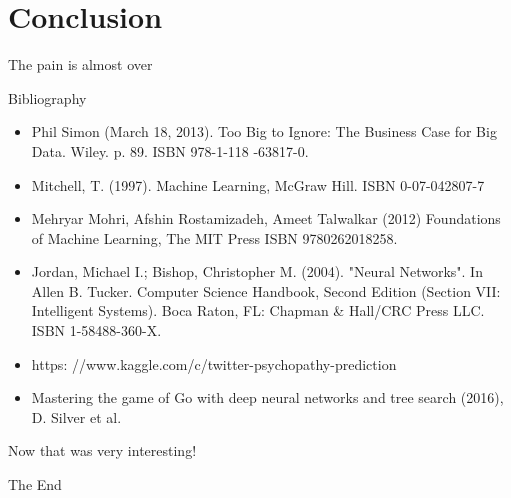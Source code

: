 \documentclass[10pt]{beamer}
\begin{document}
	
	
	\section{Conclusion}
		\begin{frame}{The pain is almost over}
		\end{frame}
		\begin{frame}{Bibliography}
			\twocolumn
			\begin{itemize}
				\item \scriptsize{Phil Simon (March 18, 2013). Too Big to Ignore: The Business Case for Big Data. Wiley. p. 89. ISBN 978-1-118
					-63817-0.}
				\item \scriptsize{Mitchell, T. (1997). Machine Learning, McGraw Hill. ISBN 0-07-042807-7}
				\item \scriptsize{ Mehryar Mohri, Afshin Rostamizadeh, Ameet Talwalkar (2012) Foundations of Machine Learning, The MIT Press ISBN 9780262018258.}
				\item \scriptsize{Jordan, Michael I.; Bishop, Christopher M. (2004). "Neural Networks". In Allen B. Tucker. Computer Science Handbook, Second Edition (Section VII: Intelligent Systems). Boca Raton, FL: Chapman \& Hall/CRC Press LLC. ISBN 1-58488-360-X.}
				\item \scriptsize{https: //www.kaggle.com/c/twitter-psychopathy-prediction}
				\item \scriptsize{Mastering the game of Go with deep neural networks and tree search (2016), D. Silver et al.}
			\end{itemize}
			\onecolumn
		\end{frame}
\endgroup

\begingroup
	\begin{frame}[plain,c]
		\hspace*{6 mm}
		\vspace*{-18 mm}
		\textcolor{blue_light}{\Large{Now that was very interesting!}}
	\end{frame}
	\begin{frame}[plain,c]
		\hspace*{27 mm}
		\vspace*{-20 mm}
		\textcolor{blue_light}{\Large{The End}}
	\end{frame}
\endgroup
\end{document}
